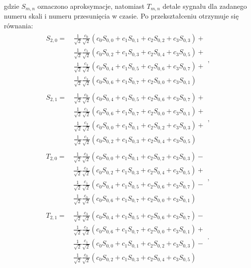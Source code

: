 gdzie $S_{m,n}$ oznaczono aproksymacje, natomiast $T_{m,n}$ detale sygnału dla zadanego numeru skali i numeru przesunięcia w czasie. Po przekształceniu otrzymuje się równania:
\begin{gather}
\begin{split}
S_{2,0} = ~
	& \frac{1}{\sqrt{2}} \frac{c_0}{\sqrt{2}} \left( c_0 S_{0,0} + c_1 S_{0,1} + c_2 S_{0,2} + c_3 S_{0,3} \right) + \\
	& \frac{1}{\sqrt{2}} \frac{c_1}{\sqrt{2}} \left( c_0 S_{0,2} + c_1 S_{0,3} + c_2 S_{0,4} + c_3 S_{0,5} \right) + \\
	& \frac{1}{\sqrt{2}} \frac{c_2}{\sqrt{2}} \left( c_0 S_{0,4} + c_1 S_{0,5} + c_2 S_{0,6} + c_3 S_{0,7} \right) + \\
	& \frac{1}{\sqrt{2}} \frac{c_3}{\sqrt{2}} \left( c_0 S_{0,6} + c_1 S_{0,7} + c_2 S_{0,0} + c_3 S_{0,1} \right)
\end{split}
\label{eqn_db2_outvect_s_2_0_rek}, \\
\begin{split}
S_{2,1} = ~
	& \frac{1}{\sqrt{2}} \frac{c_0}{\sqrt{2}} \left( c_0 S_{0,4} + c_1 S_{0,5} + c_2 S_{0,6} + c_3 S_{0,7} \right) + \\
	& \frac{1}{\sqrt{2}} \frac{c_1}{\sqrt{2}} \left( c_0 S_{0,6} + c_1 S_{0,7} + c_2 S_{0,0} + c_3 S_{0,1} \right) + \\
	& \frac{1}{\sqrt{2}} \frac{c_2}{\sqrt{2}} \left( c_0 S_{0,0} + c_1 S_{0,1} + c_2 S_{0,2} + c_3 S_{0,3} \right) + \\
	& \frac{1}{\sqrt{2}} \frac{c_3}{\sqrt{2}} \left( c_0 S_{0,2} + c_1 S_{0,3} + c_2 S_{0,4} + c_3 S_{0,5} \right)
\end{split}
\label{eqn_db2_outvect_s_2_1_rek}, \\
\begin{split}
T_{2,0} = ~
	& \frac{1}{\sqrt{2}} \frac{c_3}{\sqrt{2}} \left( c_0 S_{0,0} + c_1 S_{0,1} + c_2 S_{0,2} + c_3 S_{0,3} \right) - \\
	& \frac{1}{\sqrt{2}} \frac{c_2}{\sqrt{2}} \left( c_0 S_{0,2} + c_1 S_{0,3} + c_2 S_{0,4} + c_3 S_{0,5} \right) + \\
	& \frac{1}{\sqrt{2}} \frac{c_1}{\sqrt{2}} \left( c_0 S_{0,4} + c_1 S_{0,5} + c_2 S_{0,6} + c_3 S_{0,7} \right) - \\
	& \frac{1}{\sqrt{2}} \frac{c_0}{\sqrt{2}} \left( c_0 S_{0,6} + c_1 S_{0,7} + c_2 S_{0,0} + c_3 S_{0,1} \right)
\end{split}
\label{eqn_db2_outvect_t_2_0_rek}, \\
\begin{split}
T_{2,1} = ~
	& \frac{1}{\sqrt{2}} \frac{c_3}{\sqrt{2}} \left( c_0 S_{0,4} + c_1 S_{0,5} + c_2 S_{0,6} + c_3 S_{0,7} \right) - \\
	& \frac{1}{\sqrt{2}} \frac{c_2}{\sqrt{2}} \left( c_0 S_{0,6} + c_1 S_{0,7} + c_2 S_{0,0} + c_3 S_{0,1} \right) + \\
	& \frac{1}{\sqrt{2}} \frac{c_1}{\sqrt{2}} \left( c_0 S_{0,0} + c_1 S_{0,1} + c_2 S_{0,2} + c_3 S_{0,3} \right) - \\
	& \frac{1}{\sqrt{2}} \frac{c_0}{\sqrt{2}} \left( c_0 S_{0,2} + c_1 S_{0,3} + c_2 S_{0,4} + c_3 S_{0,5} \right)
\end{split}
\label{eqn_db2_outvect_t_2_1_rek}.
\end{gather}
